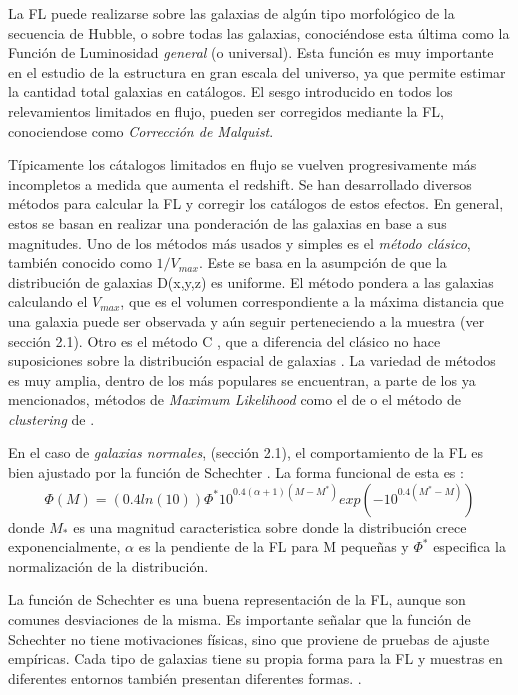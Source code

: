 \documentclass[a4paper,10pt]{article}
\begin{document}
La FL puede realizarse sobre las galaxias de alg\'un tipo morfol\'ogico de la secuencia de Hubble, o sobre todas las galaxias, conoci\'endose esta \'ultima como la Funci\'on de Luminosidad \textit{general} (o universal). Esta funci\'on es muy importante en el estudio de la estructura en gran escala del universo, ya que permite estimar la cantidad total galaxias en cat\'alogos. El sesgo introducido en todos los relevamientos limitados en flujo, pueden ser corregidos mediante la FL, conociendose como \textit{Correcci\'on de Malquist}. 


T\'ipicamente los c\'atalogos limitados en flujo se vuelven progresivamente m\'as incompletos a medida que aumenta el redshift. Se han desarrollado diversos m\'etodos para calcular la FL y corregir los cat\'alogos de estos efectos. En general, estos se basan en realizar una ponderaci\'on de las galaxias en base a sus magnitudes. 
Uno de los m\'etodos m\'as usados y simples es el \textit{m\'etodo cl\'asico}, tambi\'en conocido como $1/V_{max}$.  Este se basa en la asumpci\'on de que la distribuci\'on de galaxias D(x,y,z) es uniforme. El m\'etodo pondera a las galaxias calculando el $V_{max}$, que es el volumen correspondiente a la m\'axima distancia que una galaxia puede ser observada y a\'un seguir perteneciendo a la muestra (ver secci\'on 2.1). Otro es el m\'etodo C \citep{Lynden-Bell1971}, que a diferencia del cl\'asico no hace suposiciones sobre la distribuci\'on espacial de galaxias \citep{Lynden-Bell1971}. La variedad de m\'etodos es muy amplia, dentro de los m\'as populares se encuentran, a parte de los ya mencionados, m\'etodos de \textit{Maximum Likelihood} como el de \citet{Choloniewski1986} o el m\'etodo de \textit{clustering} de \citet{Yee1984}.

En el caso de \textit{galaxias normales}, (secci\'on 2.1), el comportamiento de la FL es bien ajustado por la funci\'on de Schechter \citep{Schneider}. La forma funcional de esta es :
\begin{equation}
 \Phi(M)=(0.4ln(10))\Phi^{\ast}10^{0.4(\alpha+1)(M-M^{\ast})}exp{(-10^{0.4(M^{\ast}-M)})}
\end{equation}
donde $M_{\ast}$ es una magnitud caracteristica sobre donde la distribuci\'on crece exponencialmente, $\alpha$ es la pendiente de la FL para M pequeñas y $\Phi^{\ast}$ especifica la normalizaci\'on de la distribuci\'on.

La funci\'on de Schechter es una buena representaci\'on de la FL, aunque son comunes desviaciones de la misma. Es importante se\~nalar que la funci\'on de Schechter no tiene motivaciones f\'isicas, sino que proviene de pruebas de ajuste emp\'iricas. Cada tipo de galaxias tiene su propia forma para la FL y muestras en diferentes entornos tambi\'en presentan diferentes formas. \citep{Schneider}.
\end{document}
